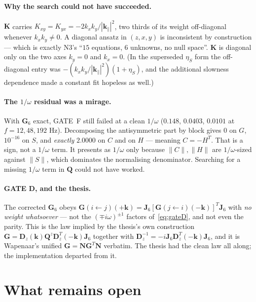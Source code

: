 \documentclass[11pt,a4paper]{article}
\newcommand{\bJ}{\mathbf{J}}
\newcommand{\bQ}{\mathbf{Q}}
\newcommand{\bG}{\mathbf{G}}
\newcommand{\bD}{\mathbf{D}}
\newcommand{\bK}{\mathbf{K}}
\newcommand{\bN}{\mathbf{N}}
\begin{document}
\paragraph{Why the search could not have succeeded.}  $\bK$ carries
$K_{xy} = K_{yx} = -2k_xk_y/|\mathbf{k}_\parallel|^2$, two thirds of its weight
off-diagonal whenever $k_xk_y\neq0$.  A diagonal ansatz in $(z,x,y)$ is
inconsistent by construction --- which is exactly N3's ``$15$ equations, $6$
unknowns, no null space''.  $\bK$ is diagonal only on the two axes $k_y=0$ and
$k_x=0$.  (In the superseded $\eta_S$ form the off-diagonal entry was
$-(k_xk_y/|\mathbf{k}_\parallel|^2)(1+\eta_S)$, and the additional
slowness dependence made a constant fit hopeless as well.)

\paragraph{The $1/\omega$ residual was a mirage.}  With $\bG_6$ exact, GATE~F
still failed at a clean $1/\omega$ ($0.148$, $0.0403$, $0.0101$ at $f=12,48,192$
Hz).  Decomposing the antisymmetric part by block gives $0$ on $G$, $10^{-16}$
on $S$, and \emph{exactly} $2.0000$ on $C$ and on $H$ --- meaning $C = -H^{T}$.
That is a sign, not a $1/\omega$ term.  It presents as $1/\omega$ only because
$\|C\|,\|H\|$ are $1/\omega$-sized against $\|S\|$, which dominates the
normalising denominator.  Searching for a missing $1/\omega$ term in $\bQ$ could
not have worked.

\paragraph{GATE D, and the thesis.}  The corrected $\bG_6$ obeys
$\bG(i\!\leftarrow\!j)(+\mathbf{k}) =
\bJ_6[\bG(j\!\leftarrow\!i)(-\mathbf{k})]^{T}\bJ_6$ with \emph{no weight
whatsoever} --- not the $(\mp i\omega)^{\pm1}$ factors of~\eqref{eq:gateD}, and
not even the parity.  This is the law implied by the thesis's own construction
$\bG = \bD_z(\mathbf{k})\bQ^{z}\bD_z^{T}(-\mathbf{k})\bJ_6$ together with
$\bD_z^{-1} = -i\bJ_6\bD_z^{T}(-\mathbf{k})\bJ_6$, and it is Wapenaar's
unified $\bG = \bN\bG^{T}\bN$ verbatim.  The thesis had the clean law all
along; the implementation departed from it.

\section{What remains open}
\end{document}
